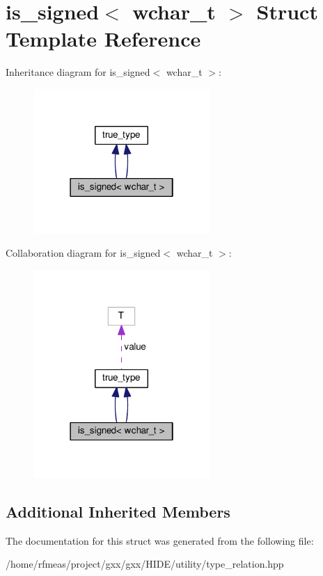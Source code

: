 \hypertarget{structis__signed_3_01wchar__t_01_4}{}\section{is\+\_\+signed$<$ wchar\+\_\+t $>$ Struct Template Reference}
\label{structis__signed_3_01wchar__t_01_4}


Inheritance diagram for is\+\_\+signed$<$ wchar\+\_\+t $>$\+:
\nopagebreak
\begin{figure}[H]
\begin{center}
\leavevmode
\includegraphics[width=190pt]{structis__signed_3_01wchar__t_01_4__inherit__graph}
\end{center}
\end{figure}


Collaboration diagram for is\+\_\+signed$<$ wchar\+\_\+t $>$\+:
\nopagebreak
\begin{figure}[H]
\begin{center}
\leavevmode
\includegraphics[width=190pt]{structis__signed_3_01wchar__t_01_4__coll__graph}
\end{center}
\end{figure}
\subsection*{Additional Inherited Members}


The documentation for this struct was generated from the following file\+:\begin{DoxyCompactItemize}
\item 
/home/rfmeas/project/gxx/gxx/\+H\+I\+D\+E/utility/type\+\_\+relation.\+hpp\end{DoxyCompactItemize}
